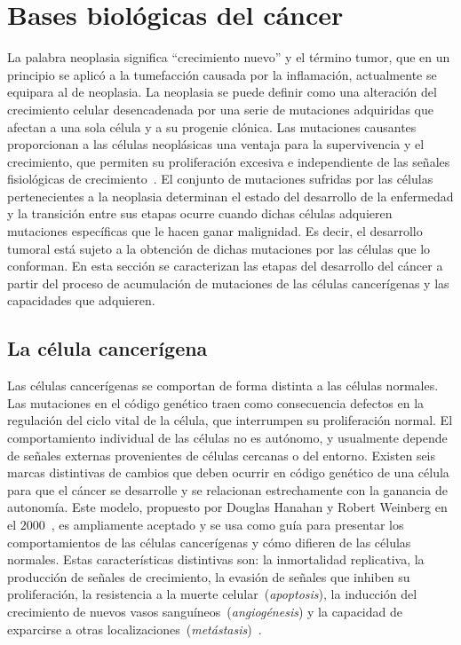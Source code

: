 \chapter{Bases biol\'ogicas del c\'ancer}
\label{sec-cancer}
La palabra neoplasia significa ``crecimiento nuevo'' y el t\'ermino tumor, que en un principio se aplic\'o a la tumefacci\'on causada por la inflamaci\'on, actualmente se equipara al de neoplasia. La neoplasia se puede definir como una alteraci\'on del crecimiento celular desencadenada por una serie de mutaciones adquiridas que afectan a una sola c\'elula y a su progenie cl\'onica. Las mutaciones causantes proporcionan a las c\'elulas neopl\'asicas una ventaja para la supervivencia y el crecimiento, que permiten su proliferaci\'on excesiva e independiente de las se\~nales fisiol\'ogicas de crecimiento~\cite{robins}. El conjunto de mutaciones sufridas por las c\'elulas pertenecientes a la neoplasia determinan el estado del desarrollo de la enfermedad y la transici\'on entre sus etapas ocurre cuando dichas c\'elulas adquieren mutaciones espec\'ificas que le hacen ganar malignidad. Es decir, el desarrollo tumoral est\'a sujeto a la obtenci\'on de dichas mutaciones por las c\'elulas que lo conforman. En esta secci\'on se caracterizan las etapas del desarrollo del c\'ancer a partir del proceso de acumulaci\'on de mutaciones de las c\'elulas cancer\'igenas y las capacidades que adquieren. 

\section{La c\'elula cancer\'igena}
\label{subsec-cell}
Las c\'elulas cancer\'igenas se comportan de forma distinta a las c\'elulas normales. Las mutaciones en el c\'odigo gen\'etico traen como consecuencia defectos en la regulaci\'on del ciclo vital de la c\'elula, que interrumpen su proliferaci\'on normal. El comportamiento individual de las c\'elulas no es aut\'onomo, y usualmente depende de se\~nales externas provenientes de c\'elulas cercanas o del entorno. Existen seis marcas distintivas de cambios que deben ocurrir en c\'odigo gen\'etico de una c\'elula para que el c\'ancer se desarrolle y se relacionan estrechamente con la ganancia de autonom\'ia. Este modelo, propuesto por Douglas Hanahan y Robert Weinberg en el $2000$~\cite{hanahan}, es ampliamente aceptado y se usa como gu\'ia para presentar los comportamientos de las c\'elulas cancer\'igenas y c\'omo difieren de las c\'elulas normales. Estas caracter\'isticas distintivas son: la inmortalidad replicativa, la producci\'on de se\~nales de crecimiento, la evasi\'on de se\~nales que inhiben su proliferaci\'on, la resistencia a la muerte celular~(\textit{apoptosis}), la inducci\'on del crecimiento de nuevos vasos sangu\'ineos~(\textit{angiog\'enesis}) y la capacidad de exparcirse a otras localizaciones~(\textit{met\'astasis})~\cite{hanahan}.

